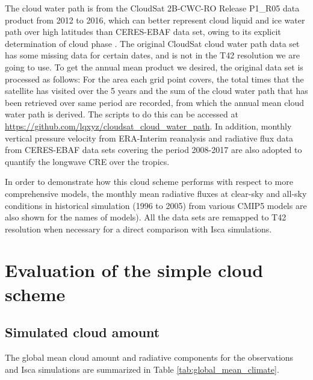 The cloud water path is from the CloudSat  2B-CWC-RO Release P1\_R05 data product \citep{Austin2009} from 2012 to 2016, which can better represent cloud liquid and ice water path over high latitudes than CERES-EBAF data set, owing to its explicit determination of cloud phase \citep{Lenaerts2017}. The original CloudSat cloud water path data set has some missing data for certain dates, and is not in the T42 resolution we are going to use. To get the annual mean product we desired, the original data set is processed as follows: For the area each grid point covers, the total times that the satellite has visited over the 5 years and the sum of the cloud water path that has been retrieved over same period are recorded, from which the annual mean cloud water path is derived. The scripts to do this can be accessed at \url{https://github.com/lqxyz/cloudsat_cloud_water_path}. In addition, monthly vertical pressure velocity from ERA-Interim reanalysis and radiative flux data from CERES-EBAF data sets covering the period 2008-2017 are also adopted to quantify the longwave CRE over the tropics.

In order to demonstrate how this cloud scheme performs with respect to more comprehensive models, the monthly mean radiative fluxes at clear-sky and all-sky conditions in historical simulation (1996 to 2005) from various CMIP5 models are also shown for the names of models). All the data sets are remapped to T42 resolution when necessary for a direct comparison with Isca simulations.

\section{Evaluation of the simple cloud scheme}

\subsection{Simulated cloud amount}
\label{sec:cld_amt}

The global mean cloud amount and radiative components for the observations and Isca simulations are summarized in Table \ref{tab:global_mean_climate}. 

